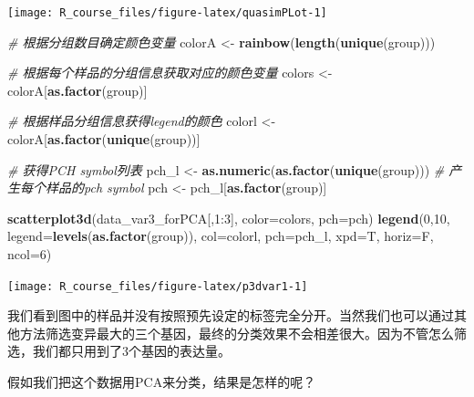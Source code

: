 \documentclass[]{article}
\newenvironment{Shaded}{\begin{snugshade}}{\end{snugshade}}
\newcommand{\KeywordTok}[1]{\textcolor[rgb]{0.13,0.29,0.53}{\textbf{{#1}}}}
\newcommand{\DataTypeTok}[1]{\textcolor[rgb]{0.13,0.29,0.53}{{#1}}}
\newcommand{\DecValTok}[1]{\textcolor[rgb]{0.00,0.00,0.81}{{#1}}}
\newcommand{\StringTok}[1]{\textcolor[rgb]{0.31,0.60,0.02}{{#1}}}
\newcommand{\CommentTok}[1]{\textcolor[rgb]{0.56,0.35,0.01}{\textit{{#1}}}}
\newcommand{\NormalTok}[1]{{#1}}
\numberwithin{figure}{section}
\numberwithin{table}{section}
\theoremstyle{definition}
\theoremstyle{definition}
\theoremstyle{definition}
\theoremstyle{remark}
\begin{document}
\begin{center}\texttt{[image: R\_course\_files/figure-latex/quasimPLot-1]} \end{center}

\begin{Shaded}
\begin{Highlighting}[]
\CommentTok{# 根据分组数目确定颜色变量}
\NormalTok{colorA <-}\StringTok{ }\KeywordTok{rainbow}\NormalTok{(}\KeywordTok{length}\NormalTok{(}\KeywordTok{unique}\NormalTok{(group)))}

\CommentTok{# 根据每个样品的分组信息获取对应的颜色变量}
\NormalTok{colors <-}\StringTok{ }\NormalTok{colorA[}\KeywordTok{as.factor}\NormalTok{(group)]}

\CommentTok{# 根据样品分组信息获得legend的颜色}
\NormalTok{colorl <-}\StringTok{ }\NormalTok{colorA[}\KeywordTok{as.factor}\NormalTok{(}\KeywordTok{unique}\NormalTok{(group))]}

\CommentTok{# 获得PCH symbol列表}
\NormalTok{pch_l <-}\StringTok{ }\KeywordTok{as.numeric}\NormalTok{(}\KeywordTok{as.factor}\NormalTok{(}\KeywordTok{unique}\NormalTok{(group)))}
\CommentTok{# 产生每个样品的pch symbol}
\NormalTok{pch <-}\StringTok{ }\NormalTok{pch_l[}\KeywordTok{as.factor}\NormalTok{(group)]}

\KeywordTok{scatterplot3d}\NormalTok{(data_var3_forPCA[,}\DecValTok{1}\NormalTok{:}\DecValTok{3}\NormalTok{], }\DataTypeTok{color=}\NormalTok{colors, }\DataTypeTok{pch=}\NormalTok{pch)}
\KeywordTok{legend}\NormalTok{(}\DecValTok{0}\NormalTok{,}\DecValTok{10}\NormalTok{, }\DataTypeTok{legend=}\KeywordTok{levels}\NormalTok{(}\KeywordTok{as.factor}\NormalTok{(group)), }\DataTypeTok{col=}\NormalTok{colorl, }\DataTypeTok{pch=}\NormalTok{pch_l, }\DataTypeTok{xpd=}\NormalTok{T, }\DataTypeTok{horiz=}\NormalTok{F, }\DataTypeTok{ncol=}\DecValTok{6}\NormalTok{)}
\end{Highlighting}
\end{Shaded}

\begin{center}\texttt{[image: R\_course\_files/figure-latex/p3dvar1-1]} \end{center}

我们看到图中的样品并没有按照预先设定的标签完全分开。当然我们也可以通过其他方法筛选变异最大的三个基因，最终的分类效果不会相差很大。因为不管怎么筛选，我们都只用到了3个基因的表达量。

假如我们把这个数据用PCA来分类，结果是怎样的呢？
\end{document}
